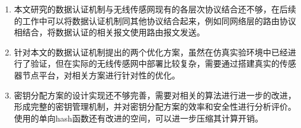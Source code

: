 \begin{enumerate}\setlength{\itemsep}{-\itemsep}
  \item 本文研究的数据认证机制与无线传感网现有的各层次协议结合还不够，在后续的工作中可以将数据认证机制同其他协议结合起来，例如同网络层的路由协议相结合，将数据认证的相关报文使用路由报文发送。
  \item 针对本文的数据认证机制提出的两个优化方案，虽然在仿真实验环境中已经进行了验证，但在实际的无线传感网中部署比较复杂，需要通过搭建真实的传感器节点平台，对相关方案进行针对性的优化。
  \item 密钥分配方案的设计实现还不够完善，需要对相关的算法进行进一步的改进，形成完整的密钥管理机制，并对密钥分配方案的效率和安全性进行分析评价。使用的单向hash函数还有改进的空间，可以进一步压缩其计算开销。
\end{enumerate}





